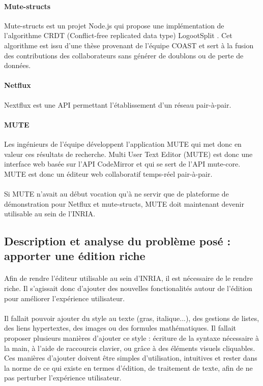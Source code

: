 \documentclass[12pt]{article}
\begin{document}
\paragraph{Mute-structs}
Mute-structs \cite{mute-structs} est un projet Node.js qui propose une implémentation de l'algorithme CRDT (Conflict-free replicated data type) LogootSplit \cite{logoot}. Cet algorithme est issu d'une thèse provenant de l'équipe COAST et sert à la fusion des contributions des collaborateurs sans générer de doublons ou de perte de données.

\paragraph{Netflux}
Nextflux \cite{netflux} est une API permettant l'établissement d'un réseau pair-à-pair.

\paragraph{MUTE}
Les ingénieurs de l'équipe développent l'application MUTE qui met donc en valeur ces résultats de recherche. Multi User Text Editor (MUTE) est donc une interface web basée sur l'API CodeMirror et qui se sert de l'API mute-core. MUTE est donc un éditeur web collaboratif temps-réel pair-à-pair.
\paragraph{}
Si MUTE n'avait au début vocation qu'à ne servir que de plateforme de démonstration pour Netflux et mute-structs, MUTE doit maintenant devenir utilisable au sein de l'INRIA.

\subsection{Description et analyse du problème posé : apporter une édition riche}
\paragraph{}
Afin de rendre l'éditeur utilisable au sein d'INRIA, il est nécessaire de le rendre riche. Il s'agissait donc d'ajouter des nouvelles fonctionalités autour de l'édition pour améliorer l'expérience utilisateur.
\paragraph{}
Il fallait pouvoir ajouter du style au texte (gras, italique...), des gestions de listes, des liens hypertextes, des images ou des formules mathématiques. Il fallait proposer plusieurs manières d'ajouter ce style : écriture de la syntaxe nécessaire à la main, à l'aide de raccourcis clavier, ou grâce à des éléments visuels cliquables. Ces manières d'ajouter doivent être simples d'utilisation, intuitives et rester dans la norme de ce qui existe en termes d'édition, de traitement de texte, afin de ne pas perturber l'expérience utilisateur.
\end{document}

